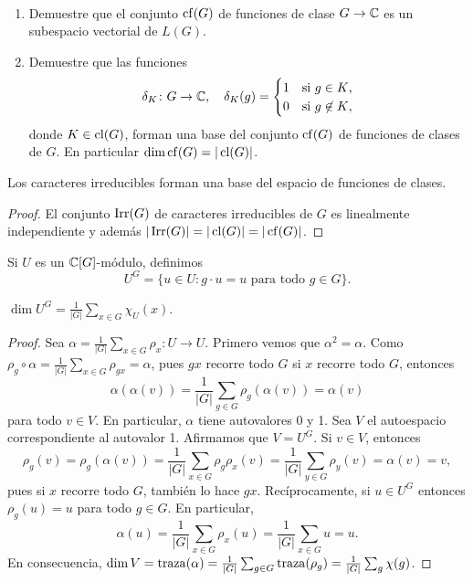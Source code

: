 \begin{exercise}\
    \begin{enumerate}
      \item Demuestre que el conjunto $\operatorname{cf}(G)$ de funciones de clase $G\to\mathbb{C}$
	es un subespacio vectorial de $L(G)$. 
      \item Demuestre que las funciones
	\[
	  \delta_K\colon G\to\mathbb{C},\quad
	  \delta_K(g)=\begin{cases}
	    1 & \text{si $g\in K$,}\\
	    0 & \text{si $g\not\in K$,}
	  \end{cases}
	\]
	donde $K\in\operatorname{cl}(G)$, forman una base del conjunto $\operatorname{cf}(G)$ de funciones de clases de 
	$G$. En particular $\dim\operatorname{cf}(G)=|\operatorname{cl}(G)|$.
	\end{enumerate}
\end{exercise}

\begin{proposition}
    Los caracteres irreducibles forman una base del espacio de funciones de clases.
\end{proposition}

\begin{proof}
    El conjunto $\operatorname{Irr}(G)$ de caracteres irreducibles de $G$ es linealmente independiente y además 
    $|\operatorname{Irr}(G)|=|\operatorname{cl}(G)|=|\operatorname{cf}(G)|$.
\end{proof}

Si $U$ es un $\mathbb{C}[G]$-módulo, definimos
\[
U^G=\{u\in U:g\cdot u=u\text{ para todo $g\in G$}\}.
\]

\begin{lemma}
\label{lem:invariantes}
  $\dim U^G=\frac{1}{|G|}\sum_{x\in G}\chi_U(x)$. 
\end{lemma}

\begin{proof}
  Sea $\alpha=\frac{1}{|G|}\sum_{x\in G}\rho_x\colon U\to U$. 
  Primero vemos que $\alpha^2=\alpha$. 
  Como $\rho_g\circ \alpha=\frac{1}{|G|}\sum_{x\in G}\rho_{gx}=\alpha$, pues  
  $gx$ recorre todo $G$ si $x$ recorre todo $G$, entonces
  \[
  \alpha(\alpha(v))=\frac{1}{|G|}\sum_{g\in G}\rho_g(\alpha(v))=\alpha(v) 
  \]
  para todo $v\in V$. En particular, $\alpha$ tiene autovalores 0 y 1. Sea $V$ 
  el autoespacio correspondiente al autovalor 1. 
  Afirmamos que $V=U^G$. Si $v\in V$, entonces
  \[
  \rho_g(v)=\rho_g(\alpha(v))=\frac{1}{|G|}\sum_{x\in G}\rho_g\rho_x(v)=\frac{1}{|G|}\sum_{y\in G}\rho_y(v)=\alpha(v)=v,
  \]
  pues si $x$ recorre todo $G$, también lo hace $gx$. 
  Recíprocamente, si $u\in U^G$ entonces
  $\rho_g(u)=u$ para todo $g\in G$. En particular, 
  \[
  \alpha(u)=\frac{1}{|G|}\sum_{x\in G}\rho_x(u)=\frac{1}{|G|}\sum_{x\in G}u=u.
  \]
  En consecuencia, 
  $\dim V=\operatorname{traza}(\alpha)=\frac{1}{|G|}\sum_{g\in G}\operatorname{traza}(\rho_g)=\frac{1}{|G|}\sum_{g}\chi(g)$.
\end{proof}

